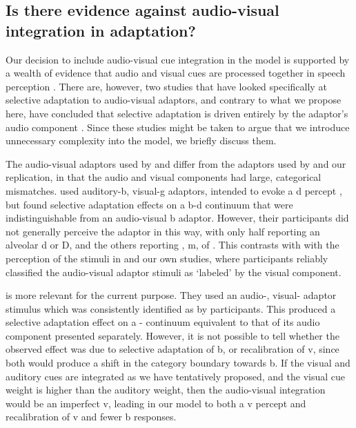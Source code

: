\subsection{Is there evidence against audio-visual integration in adaptation?}
\label{sec:evid-against-audio}

Our decision to include audio-visual cue integration in the model is supported by a wealth of evidence that audio and visual cues are processed together in speech perception \autocite[e.g.,][]{Bejjanki2011,Massaro2004,VanWassenhove2005,Vatakis2007}. There are, however, two studies that have looked specifically at selective adaptation to audio-visual adaptors, and contrary to what we propose here, have concluded that selective adaptation is driven entirely by the adaptor's audio component \autocite{Roberts1981,Saldana1994}. Since these studies might be taken to argue that we introduce unnecessary complexity into the model, we briefly discuss them.

The audio-visual adaptors used by \textcite{Roberts1981} and \textcite{Saldana1994} differ from the adaptors used by \textcite{Vroomen2007} and our replication, in that the audio and visual components had large, categorical mismatches.  \textcite{Roberts1981} used auditory-\ph b, visual-\ph g adaptors, intended to evoke a \ph d percept \autocite[as in][]{McGurk1976}, but found selective adaptation effects on a \ph b-\ph d continuum that were indistinguishable from an audio-visual \ph b adaptor.  However, their participants did not generally perceive the adaptor in this way, with only half reporting an alveolar \ph d or \ph D, and the others reporting , \ph m, of . This contrasts with with the perception of the stimuli in \textcite{Vroomen2007} and our own studies, where participants reliably classified the audio-visual adaptor stimuli as `labeled' by the visual component.

\textcite{Saldana1994} is more relevant for the current purpose. They used an audio-, visual- adaptor stimulus which was consistently identified as  by participants.  This produced a selective adaptation effect on a - continuum equivalent to that of its audio  component presented separately.  However, it is not possible to tell whether the observed effect was due to selective adaptation of \ph b, or recalibration of \ph v, since both would produce a shift in the category boundary towards \ph b.  If the visual and auditory cues are integrated as we have tentatively proposed, and the visual cue weight is higher than the auditory weight, then the audio-visual integration would be an imperfect \ph v, leading in our model to both a \ph v percept and recalibration of \ph v and fewer \ph b responses.

